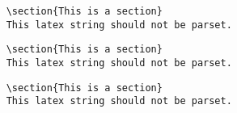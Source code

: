 \begin{verbatim}
    \section{This is a section}
    This latex string should not be parset.
\end{verbatim}

\begin{lstlisting}
    \section{This is a section}
    This latex string should not be parset.
\end{lstlisting}

\begin{verbatim}
    \section{This is a section}
    This latex string should not be parset.
\end{verbatim}
